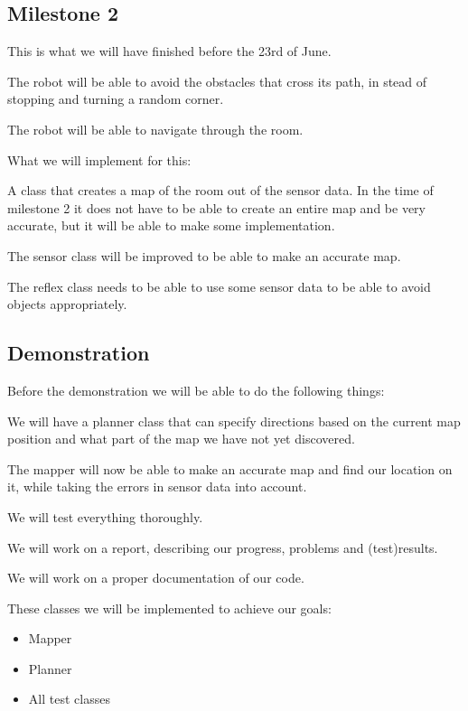 \subsection*{Milestone 2}
This is what we will have finished before the 23rd of June.
\begin{description}
\small
\item[Avoid obstacles:] The robot will be able to avoid the obstacles that
cross its path, in stead of stopping and turning a random corner.
\item[Navigate:] The robot will be able to navigate through the room.
\end{description}

What we will implement for this:
\begin{description}
\small
\item[Mapper:] A class that creates a map of the room out of the sensor
data. In the time of milestone 2 it does not have to be able to create an entire
map and be very accurate, but it will be able to make some implementation.
\item[Improved Sensor:] The sensor class will be improved to be able to make
an accurate map.
\item[Improved Reflexes:] The reflex class needs to be able to use some
sensor data to be able to avoid objects appropriately. 
\end{description}


\subsection*{Demonstration}
Before the demonstration we will be able to do the following things:
\begin{description}
\small
\item[Planner:] We will have a planner class that can specify directions
based on the current map position and what part of the map we have not yet
discovered.
\item[Improved Mapper:] The mapper will now be able to make an accurate map
and find our location on it, while taking the errors in sensor data into account.
\item[Tests:] We will test everything thoroughly.
\item[Report:] We will work on a report, describing our progress, problems
and (test)results.
\item[Documentation:] We will work on a proper documentation of our code.
\end{description}

These classes we will be implemented to achieve our goals:
\begin{itemize}
\item Mapper
\item Planner
\item All test classes
\end{itemize}
